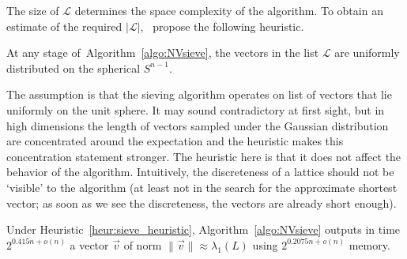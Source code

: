 The size of $\mathcal{L}$ determines the space complexity of the algorithm. To obtain an estimate of the required $|\mathcal{L}|$,~\cite{NV08} propose the following heuristic.

\begin{heuristic} \label{heur:sieve_heuristic}
	At any stage of~Algorithm~\ref{algo:NVsieve}, the vectors in the list $\mathcal{L}$
	are uniformly distributed on the spherical  $S^{n-1}$.
\end{heuristic}

The assumption is that the sieving algorithm operates on list of vectors that  lie uniformly on the unit sphere. It may sound contradictory at first sight, but in high dimensions the length of vectors sampled under the Gaussian distribution are concentrated around the expectation and the heuristic makes this concentration statement stronger. The heuristic here is that it does not affect the behavior of the algorithm. Intuitively, the discreteness of a lattice should not be `visible’ to the algorithm (at least not in the search for the approximate shortest vector; as soon as we see the discreteness, the vectors are already short enough).

\begin{theorem} \label{thm:NVsieve}
	Under Heuristic~\ref{heur:sieve_heuristic}, Algorithm~\ref{algo:NVsieve} outputs in time $2^{0.415n + o(n)}$ a vector $\vec v$ of norm $\| \vec v \| \approx \lambda_1(L)$ using $2^{0.2075n + o(n)}$ memory.
\end{theorem}

